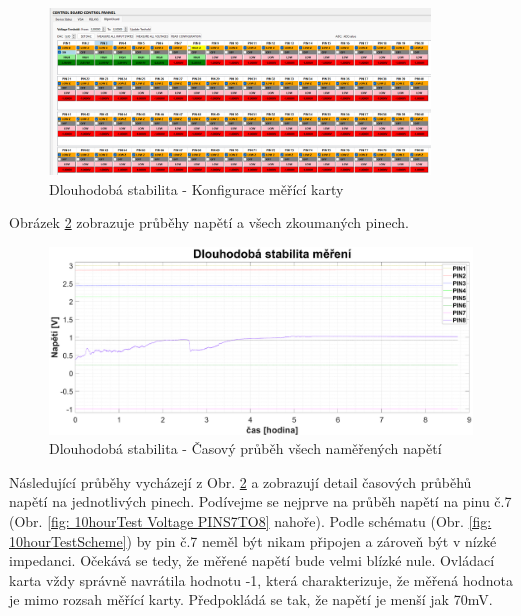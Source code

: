 \begin{figure}[ht!]
    \centering
    \includegraphics[width = 0.9\textwidth]{obrazky/10hourTestConfig.png}
    \caption{Dlouhodobá stabilita - Konfigurace měřící karty}
    \label{fig: 10hourTestConfig}
\end{figure}
\clearpage
Obrázek \ref{fig: 10hourTest ALL} zobrazuje průběhy napětí a všech zkoumaných pinech.
\begin{figure}[ht!]
    \centering
    \includegraphics[width = 1\textwidth]{obrazky/matlab_generated/VOLTAGE_TESTER/dlouhodoba_stabilita_cas_prehled.eps}
    \caption{Dlouhodobá stabilita - Časový průběh všech naměřených napětí}
    \label{fig: 10hourTest ALL}
\end{figure}

Následující průběhy vycházejí z Obr. \ref{fig: 10hourTest ALL} a zobrazují detail časových průběhů napětí na jednotlivých pinech.
Podívejme se nejprve na průběh napětí na pinu č.7 (Obr. \ref{fig: 10hourTest Voltage PINS7TO8} nahoře).
Podle schématu (Obr. \ref{fig: 10hourTestScheme}) by pin č.7 neměl být nikam připojen a zároveň být v nízké impedanci. Očekává se tedy,
že měřené napětí bude velmi blízké nule. Ovládací karta vždy správně navrátila hodnotu -1,
která charakterizuje, že měřená hodnota je mimo rozsah měřící karty. Předpokládá se tak, že napětí je menší jak 70mV.\\

